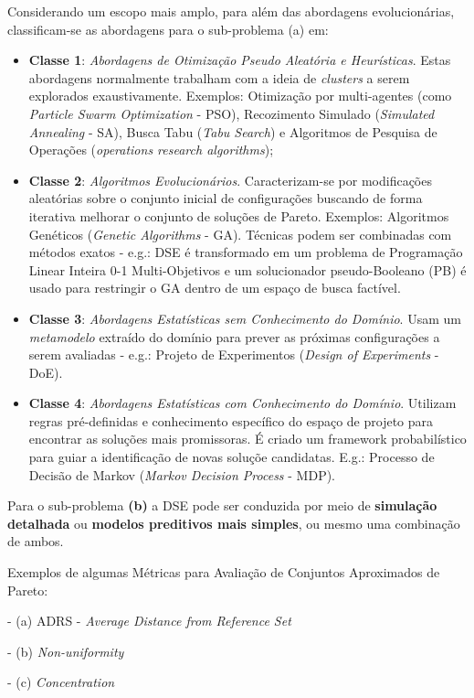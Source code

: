 \documentclass[tese-proposta,nocipinfo]{texufpel}
\begin{document}
Considerando um escopo mais amplo, para além das abordagens evolucionárias, classificam-se as abordagens para o sub-problema (a) em:
\begin{itemize}
\item \textbf{Classe 1}: \textit{Abordagens de Otimização Pseudo Aleatória e Heurísticas}. Estas abordagens normalmente trabalham com a ideia de \textit{clusters} a serem explorados exaustivamente. Exemplos: Otimização por multi-agentes (como \textit{Particle Swarm Optimization} - PSO), Recozimento Simulado (\textit{Simulated Annealing} - SA), Busca Tabu (\textit{Tabu Search}) e Algoritmos de Pesquisa de Operações (\textit{operations research algorithms});
\item \textbf{Classe 2}: \textit{Algoritmos Evolucionários}. Caracterizam-se por modificações aleatórias sobre o conjunto inicial de configurações buscando de forma iterativa melhorar o conjunto de soluções de Pareto. Exemplos: Algoritmos Genéticos (\textit{Genetic Algorithms} - GA). Técnicas podem ser combinadas com métodos exatos - e.g.: DSE é transformado em um problema de Programação Linear Inteira 0-1 Multi-Objetivos e um solucionador pseudo-Booleano (PB) é usado para restringir o GA dentro de um espaço de busca factível.
\item \textbf{Classe 3}: \textit{Abordagens Estatísticas sem Conhecimento do Domínio}. Usam um \textit{metamodelo} extraído do domínio para prever as próximas configurações a serem avaliadas - e.g.: Projeto de Experimentos (\textit{Design of Experiments} - DoE).
\item \textbf{Classe 4}: \textit{Abordagens Estatísticas com Conhecimento do Domínio}. Utilizam regras pré-definidas e conhecimento específico do espaço de projeto para encontrar as soluções mais promissoras. É criado um  framework probabilístico para guiar a identificação de novas soluçõe candidatas. E.g.: Processo de Decisão de Markov (\textit{Markov Decision Process} - MDP).
\end{itemize}

Para o sub-problema \textbf{(b)} a DSE pode ser conduzida por meio de \textbf{simulação detalhada} ou \textbf{modelos preditivos mais simples}, ou mesmo uma combinação de ambos.

Exemplos de algumas Métricas para Avaliação de Conjuntos Aproximados de Pareto:

- (a) ADRS - \textit{Average Distance from Reference Set}

- (b) \textit{Non-uniformity}

- (c) \textit{Concentration}
\end{document}
